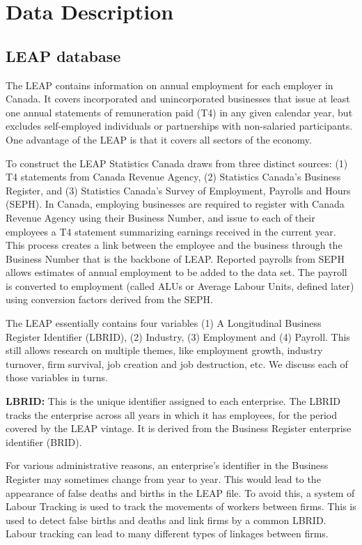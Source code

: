\documentclass{article}
\begin{document}
\section{Data Description}

\subsection{LEAP database}

The LEAP contains information on annual employment for each employer in Canada. It covers incorporated and unincorporated businesses that issue at least one annual statements of remuneration paid (T4) in any given calendar year, but excludes self-employed individuals or partnerships with non-salaried participants. One advantage of the LEAP is that it covers all sectors of the economy.%

To construct the LEAP Statistics Canada draws from three distinct sources: (1) T4 statements from Canada Revenue Agency, (2) Statistics Canada's Business Register, and (3) Statistics Canada's Survey of Employment, Payrolls and Hours (SEPH). In Canada, employing businesses are required to register with Canada Revenue Agency using their Business Number, and issue to each of their employees a T4 statement summarizing earnings received in the current year. This process creates a link between the employee and the business through the Business Number that is the backbone of LEAP. Reported payrolls from SEPH allows estimates of annual employment to be added to the data set. The payroll is converted to employment (called ALUs or Average Labour Units, defined later) using conversion factors derived from the SEPH. 

The LEAP essentially contains four variables (1) A Longitudinal Business Register Identifier (LBRID), (2) Industry, (3) Employment and (4) Payroll. This still allows research on multiple themes, like employment growth, industry turnover, firm survival, job creation and job destruction, etc. We discuss each of those variables in turns. 

\textbf{LBRID:} This is the unique identifier assigned to each enterprise.  The LBRID tracks the enterprise across all years in which it has employees, for the period covered by the LEAP vintage. It is derived from the Business Register enterprise identifier (BRID). 

For various administrative reasons, an enterprise's identifier in the Business Register may sometimes change from year to year.  This would lead to the appearance of false deaths and births in the LEAP file.  To avoid this, a system of Labour Tracking is used to track the movements of workers between firms.  This is used to detect false births and deaths and link firms by a common LBRID. Labour tracking can lead to many different types of linkages between firms. 
\end{document}
